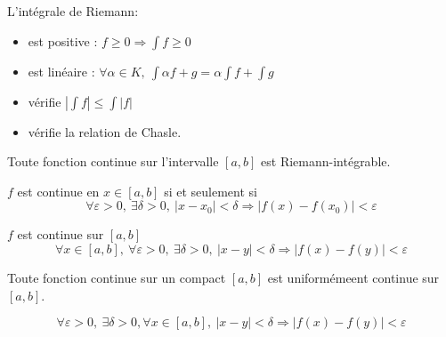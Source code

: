 \documentclass[../main.tex]{subfile}
\begin{document}
\begin{prop}
	L'intégrale de Riemann:
	\begin{itemize}
		\item est positive : $f \geq 0 \Rightarrow \int f \geq 0$
		\item est linéaire : $\forall \alpha \in K, \ \int \alpha f + g = \alpha \int f + \int g$
		\item vérifie $|\int f| \leq \int |f|$
		\item vérifie la relation de Chasle.
	\end{itemize}
\end{prop}


\begin{theo}
	Toute fonction continue sur l'intervalle $[a, b]$ est Riemann-intégrable.
\end{theo}

\begin{rappel}
	$f$ est continue en $x \in [a, b]$ si et seulement si\\
	$$\forall \varepsilon > 0, \ \exists \delta > 0, \ |x - x_0| < \delta \Rightarrow |f(x) - f(x_0)| < \varepsilon$$
\end{rappel}

\begin{defi}
	$f$ est continue sur $[a, b]$\\
	$$\forall x \in [a, b], \ \forall \varepsilon > 0, \ \exists \delta > 0, \ |x - y| < \delta \Rightarrow |f(x) - f(y)| < \varepsilon$$
\end{defi}

\begin{lemme}
	Toute fonction continue sur un compact $[a, b]$ est uniformémeent continue sur $[a, b]$.
\end{lemme}

\begin{defi}
	$$\forall \varepsilon > 0, \ \exists \delta > 0, \forall x \in [a, b], \ |x - y| < \delta \Rightarrow |f(x) - f(y)| < \varepsilon$$
\end{defi}
\end{document}
